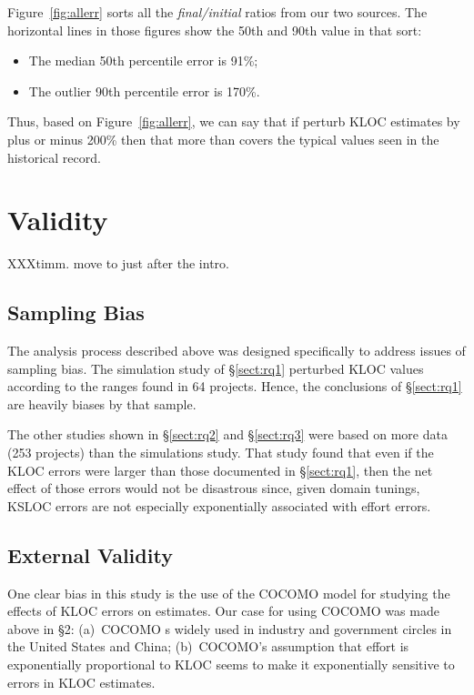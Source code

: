\documentclass[final,twocolumn]{elsarticle}
\newcommand{\bi}{\begin{itemize}[leftmargin=0.4cm]}
\newcommand{\ei}{\end{itemize}}
\newcommand{\tion}[1]{\S\ref{sect:#1}}
\newcommand{\fig}[1]{Figure~\ref{fig:#1}}
\theoremstyle{break}
\begin{document}
\fig{allerr} sorts all the {\em final/initial} ratios from our two sources. The horizontal lines in those figures show
the 50th and 90th value in that sort:
\bi
\item The median 50th percentile error is 91\%;
 \item The outlier 90th percentile error is 170\%.
   \ei
   Thus, based on \fig{allerr}, we can say that if perturb KLOC estimates by plus or minus 200\% then that more than covers the typical
   values seen in the historical record.

   
    
   

 
  

\section{Validity}

XXXtimm. move to just after the intro.

\subsection{Sampling Bias}
The analysis process described above was designed specifically to
address issues of sampling bias.   The simulation study of \tion{rq1} perturbed KLOC values according to the ranges found
in 64 projects. Hence, the conclusions of \tion{rq1} are heavily biases by that sample.

The other studies shown in \tion{rq2} and \tion{rq3} were based on more data (253 projects) than the simulations study.  That study
found that even if the KLOC errors were larger than those documented in \tion{rq1}, then the net effect of 
those errors would not be disastrous since, given domain tunings,   KSLOC  errors are  not especially exponentially associated with effort errors. 
 


\subsection{External Validity}

One clear bias in this study is the use of the COCOMO model for studying the effects
of KLOC errors on estimates. Our case for using COCOMO was made above in {\S}2: 
(a)~COCOMO s widely used in industry and government circles in the United States and China;
(b)~COCOMO's assumption that effort is exponentially proportional to KLOC seems to make it
exponentially sensitive to errors in KLOC estimates. 
\end{document}
